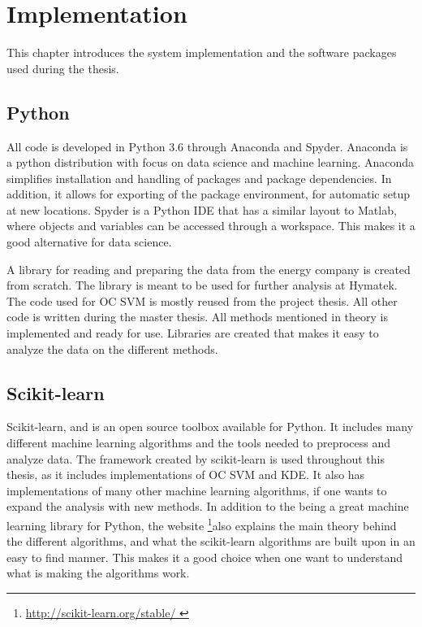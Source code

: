 \chapter{Implementation}\label{cha:implementation}
This chapter introduces the system implementation and the software packages used during the thesis.

\section{Python}
    All code is developed in Python 3.6 through Anaconda and Spyder. Anaconda is a python distribution with focus on data science and machine learning. Anaconda simplifies installation and handling of packages and package dependencies. In addition, it allows for exporting of the package environment, for automatic setup at new locations. Spyder is a Python IDE that has a similar layout to Matlab, where objects and variables can be accessed through a workspace. This makes it a good alternative for data science. 
    
    A library for reading and preparing the data from the energy company is created from scratch. The library is meant to be used for further analysis at Hymatek. The code used for OC SVM is mostly reused from the project thesis. All other code is written during the master thesis. All methods mentioned in theory is implemented and ready for use. Libraries are created that makes it easy to analyze the data on the different methods. 
    
    
\section{Scikit-learn}
Scikit-learn, \cite{scikit-learn} and \cite{scikit-web} is an open source toolbox available for Python. It includes many different machine learning algorithms and the tools needed to preprocess and analyze data. The framework created by scikit-learn is used throughout this thesis, as it includes implementations of OC SVM and KDE. It also has implementations of many other machine learning algorithms, if one wants to expand the analysis with new methods. In addition to the being a great machine learning library for Python, the website \footnote{\url{http://scikit-learn.org/stable/ }}also explains the main theory behind the different algorithms, and what the scikit-learn algorithms are built upon in an easy to find manner. This makes it a good choice when one want to understand what is making the algorithms work.        

